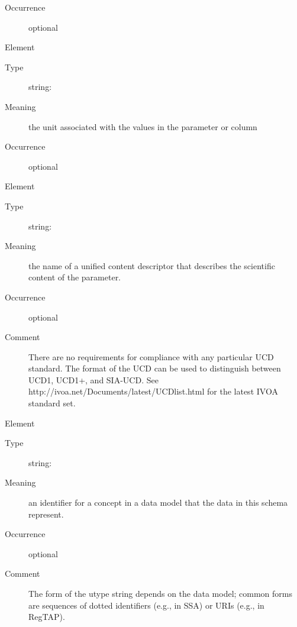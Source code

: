 \documentclass[11pt,a4paper]{ivoa}
\begin{document}
\begin{generated}
\begin{bigdescription}
\begin{description}
\item[Occurrence] optional

\end{description}
\item[Element \xmlel{unit}]
\begin{description}
\item[Type] string: 
\item[Meaning] 
                  the unit associated with the values in the parameter
                  or column
               
\item[Occurrence] optional

\end{description}
\item[Element \xmlel{ucd}]
\begin{description}
\item[Type] string: 
\item[Meaning] 
                  the name of a unified content descriptor that
                  describes the scientific content of the parameter.  
               
\item[Occurrence] optional
\item[Comment] 
                  There are no requirements for compliance with any 
                  particular UCD standard.  The format of the UCD can
                  be used to distinguish between UCD1, UCD1+, and
                  SIA-UCD.  See 
                  http://ivoa.net/Documents/latest/UCDlist.html
                  for the latest IVOA standard set.  
               

\end{description}
\item[Element \xmlel{utype}]
\begin{description}
\item[Type] string: 
\item[Meaning] 
                  an identifier for a concept in a data model that
                  the data in this schema represent.  
               
\item[Occurrence] optional
\item[Comment] 
                  The form of the utype string depends on the data
                  model; common forms are sequences of dotted identifiers
                  (e.g., in SSA) or URIs (e.g., in RegTAP).
               

\end{description}


\end{bigdescription}\endgroup

\endgroup
\end{generated}
\end{document}
